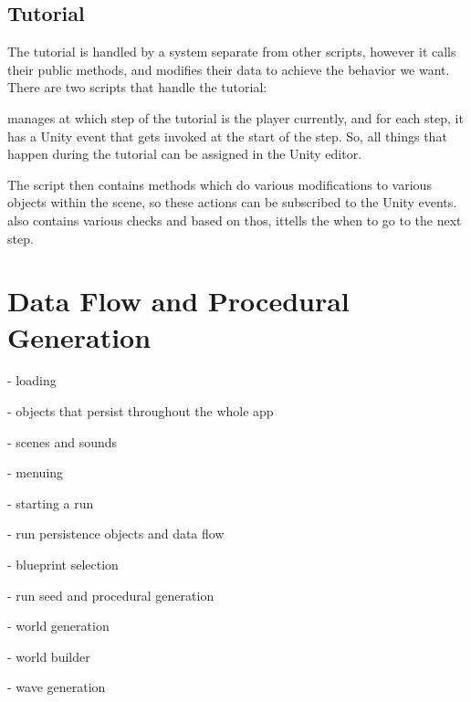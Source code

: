\subsection{Tutorial}

The tutorial is handled by a system separate from other scripts, however it calls their public methods, and modifies their data to achieve the behavior we want.
There are two scripts that handle the tutorial:

 manages at which step of the tutorial is the player currently, and for each step, it has a Unity event that gets invoked at the start of the step.
So, all things that happen during the tutorial can be assigned in the Unity editor.

The script  then contains methods which do various modifications to various objects within the scene, so these actions can be subscribed to the  Unity events.
 also contains various checks and based on thos, ittells the  when to go to the next step.

\section{Data Flow and Procedural Generation}\label{sec:docs-data}

- loading

- objects that persist throughout the whole app

- scenes and sounds

- menuing

- starting a run

- run persistence objects and data flow

- blueprint selection

- run seed and procedural generation

- world generation

- world builder

- wave generation

